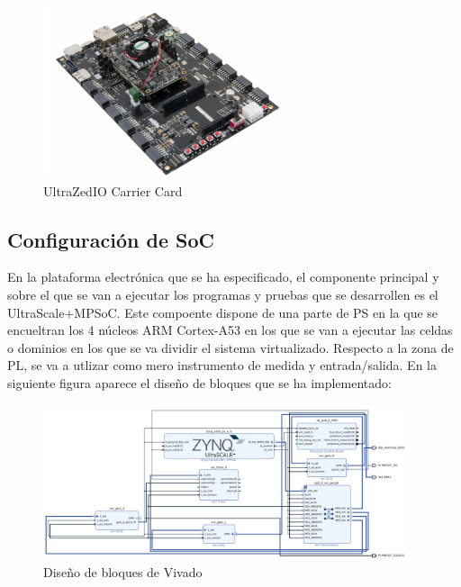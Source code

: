 \begin{figure}[h]
	\centering
	\includegraphics[width=0.65\textwidth]{recursos/ultrazed-eg-carrier.png}
	\caption{UltraZed\texttrademark IO Carrier Card}
	\label{fig:ultrazed-eg-carrier}
\end{figure}

\subsection{Configuración de SoC} \label{vivado_config}

En la plataforma electrónica que se ha especificado, el componente principal y sobre el que se van a ejecutar los programas y pruebas que se desarrollen es el UltraScale+\texttrademark MPSoC. Este compoente dispone de una parte de \acrshort{PS} en la que se encueltran los 4 núcleos ARM Cortex-A53 en los que se van a ejecutar las celdas o dominios en los que se va dividir el sistema virtualizado. Respecto a la zona de \acrshort{PL}, se va a utlizar como mero instrumento de medida y entrada/salida. En la siguiente figura aparece el diseño de bloques que se ha implementado:

\begin{figure}[h]
	\centering
	\includegraphics[width=0.95\textwidth]{recursos/vivado_1.png}
	\caption{Diseño de bloques de Vivado}
	\label{fig:vivado_1}
\end{figure}

